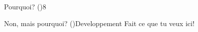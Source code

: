 \documentclass[letterpaper,12pt]{article}
\begin{document}
\begin{questions}
  
  
  \makeDeveloppementSection
   
  \begin{Developpement}{Pourquoi? ()}{8}
  \end{Developpement}

  \begin{customQuestion}{Non, mais pourquoi? ()}{Developpement}
	Fait ce que tu veux ici!  
	
   \end{customQuestion}
   
  
\end{questions}
\end{document}
